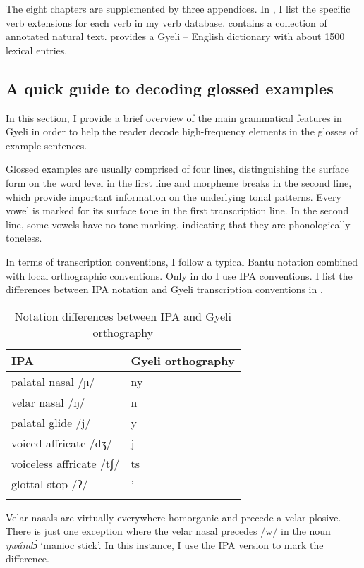 The eight chapters are supplemented by three appendices. In , I list the specific verb extensions for each verb in my verb database.  contains a collection of annotated natural text.  provides a Gyeli -- English dictionary with about 1500 lexical entries. 

\subsection{A quick guide to decoding glossed examples}
\label{sec:Guide}

In this section, I provide a brief overview of the main grammatical features in Gyeli in order to help the reader decode high-frequency elements in the glosses of example sentences.

Glossed examples are usually comprised of four lines, distinguishing the surface form on the word level in the first line and morpheme breaks in the second line, which provide important information on the underlying tonal patterns. Every vowel is marked for its surface tone in the first transcription line. In the second line, some vowels have no tone marking, indicating that they are phonologically toneless. 

In terms of transcription conventions, I follow a typical Bantu notation combined with local orthographic conventions. Only in  do I use IPA conventions. I list the differences between IPA notation and Gyeli transcription conventions in .

\begin{table}
\begin{tabularx}{.8\textwidth}{Xl}
\lsptoprule
IPA & Gyeli orthography \\
\midrule
palatal nasal /ɲ/ & { ny} \\
velar nasal /ŋ/ & { n}  \\
palatal glide /j/ & { y} \\
voiced affricate /dʒ/ &  { j}  \\
voiceless affricate /tʃ/ & { ts} \\
glottal stop /ʔ/ &  { '} \\
\lspbottomrule
\end{tabularx}
\caption{Notation differences between IPA and Gyeli orthography}
\label{Tab:notation}
\end{table}

Velar nasals are virtually everywhere homorganic and precede a velar plosive. There is just one exception where the velar nasal precedes /w/ in the noun {\itshape ŋwándɔ́} `manioc stick'.  In this instance, I use the IPA version to mark the difference.


